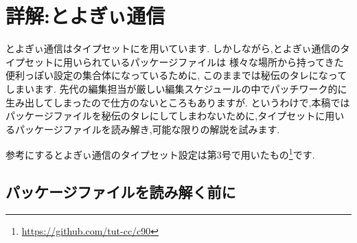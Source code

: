 \newcommand*{\reflisting}[1]{\lstlistingname\ \ref{#1}}
\renewcommand*\descriptionlabel[1]{\normalfont\headfont #1 :\hfil}

\chapter{詳解:とよぎぃ通信}

とよぎぃ通信はタイプセットに{\pLaTeX}を用いています.
しかしながら,とよぎぃ通信のタイプセットに用いられているパッケージファイルは
様々な場所から持ってきた便利っぽい設定の集合体になっているために,
このままでは秘伝のタレになってしまいます.
先代の編集担当が厳しい編集スケジュールの中でパッチワーク的に生み出してしまったので仕方のないところもありますが.
というわけで,本稿ではパッケージファイルを秘伝のタレにしてしまわないために,タイプセットに用いるパッケージファイルを読み解き,可能な限りの解説を試みます.

参考にするとよぎぃ通信のタイプセット設定は第3号で用いたもの\footnote{\url{https://github.com/tut-cc/c90}}です.

\section{パッケージファイルを読み解く前に}
